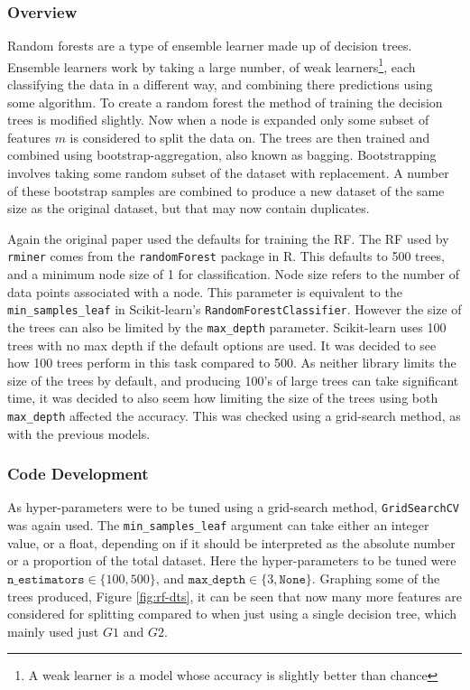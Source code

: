 \documentclass[12pt,a4paper,titlepage,twoside]{report}
\begin{document}
\subsubsection*{Overview}
	Random forests are a type of ensemble learner made up of decision trees. Ensemble learners work by taking a large number, of weak learners\footnote{A weak learner is a model whose accuracy is slightly better than chance}, each classifying the data in a different way, and combining there predictions using some algorithm\cite{ml-algorithmic-perspective}. To create a random forest the method of training the decision trees is modified slightly. Now when a node is expanded only some subset of features $m$ is considered to split the data on. The trees are then trained and combined using bootstrap-aggregation, also known as bagging. Bootstrapping involves taking some random subset of the dataset with replacement. A number of these bootstrap samples are combined to produce a new dataset of the same size as the original dataset, but that may now contain duplicates. \par
	Again the original paper used the defaults for training the RF. The RF used by \texttt{rminer} comes from the \texttt{randomForest} package in R. This defaults to 500 trees, and a minimum node size of 1 for classification. Node size refers to the number of data points associated with a node. This parameter is equivalent to the \texttt{min_samples_leaf} in Scikit-learn's \texttt{RandomForestClassifier}. However the size of the trees can also be limited by the \texttt{max_depth} parameter. Scikit-learn uses 100 trees with no max depth if the default options are used. It was decided to see how 100 trees perform in this task compared to 500. As neither library limits the size of the trees by default, and producing 100's of large trees can take significant time, it was decided to also seem how limiting the size of the trees using both \texttt{max_depth} affected the accuracy. This was checked using a grid-search method, as with the previous models.
	
\subsubsection*{Code Development}
	As hyper-parameters were to be tuned using a grid-search method, \texttt{GridSearchCV} was again used. The \texttt{min_samples_leaf} argument can take either an integer value, or a float, depending on if it should be interpreted as the absolute number or a proportion of the total dataset. Here the hyper-parameters to be tuned were $\texttt{n_estimators} \in \{100, 500\}$, and $\texttt{max_depth} \in \{3, \texttt{None}\}$.
	Graphing some of the trees produced, Figure \ref{fig:rf-dts}, it can be seen that now many more features are considered for splitting compared to when just using a single decision tree, which mainly used just $G1$ and $G2$.
	
\end{document}
